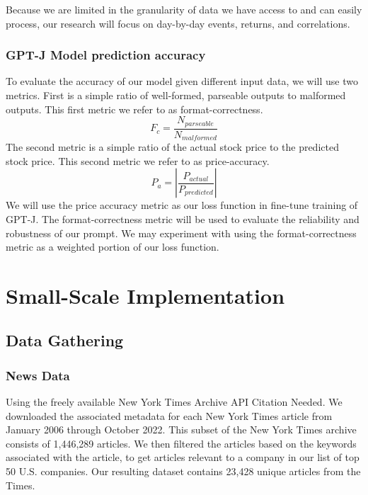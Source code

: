 \documentclass[conference]{IEEEtran}
\begin{document}
Because we are limited in the granularity of data we have access to and can easily process, our research will focus on day-by-day events, returns, and correlations.

\subsubsection{GPT-J Model prediction accuracy}
To evaluate the accuracy of our model given different input data, we will use two metrics. First is a simple ratio of well-formed, parseable outputs to malformed outputs. This first metric we refer to as format-correctness. 
\begin{equation}
    F_c=\frac{N_{parseable}}{N_{malformed}}
\end{equation}
The second metric is a simple ratio of the actual stock price to the predicted stock price. This second metric we refer to as price-accuracy.
\begin{equation}
    P_a=\left|\frac{P_{actual}}{P_{predicted}}\right|
\end{equation}
We will use the price accuracy metric as our loss function in fine-tune training of GPT-J. The format-correctness metric will be used to evaluate the reliability and robustness of our prompt. We may experiment with using the format-correctness metric as a weighted portion of our loss function.
\section{Small-Scale Implementation}
\subsection{Data Gathering} 
\subsubsection{News Data}
Using the freely available New York Times Archive API {Citation Needed}. We downloaded the associated metadata for each New York Times article from January 2006 through October 2022. This subset of the New York Times archive consists of 1,446,289 articles. We then filtered the articles based on the keywords associated with the article, to get articles relevant to a company in our list of top 50 U.S. companies. Our resulting dataset contains 23,428 unique articles from the Times. 
\end{document}
